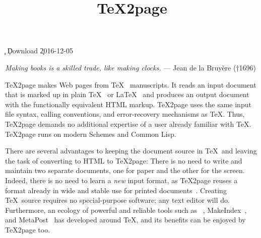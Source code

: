 %




\ifx\TZPtitle\UnDeFiNeD
\def\TZPtitle{TeX2page}\fi

\title{\TeX2page}

\smallskip

\c{}
%
\ifx\inpltdist\Undefined
\ifx\shipout\UnDeFiNeD
\c{Download
}
\else
\c{2016-12-05} %
\fi
\fi
%


\ifx\shipout\UnDeFiNeD
\centerline{}
\fi

{\obeylines\raggedleft
\ifx\shipout\UnDeFiNeD\small\else\eightfont\fi
{\it Making books is a skilled trade,
like making clocks.}
— Jean de la Bruyère (†1696)
}


\medskip


\n
\TeX2page
makes Web pages
from \TeX~\cite{texbook} manuscripts.
It reads an
input document that is marked up in
plain \TeX~\cite{clark:tex} or \LaTeX~\cite{latex}
and
produces an output document with the functionally
equivalent HTML markup.
\TeX2page uses the same input
file syntax, calling conventions, and  error-recovery
mechanisms as \TeX.  Thus, \TeX2page demands no additional
expertise of a user already familiar with \TeX.
\TeX2page runs on modern Schemes and Common Lisp.

There are several advantages to keeping the document
source in \TeX\ and leaving the task of converting to
HTML to \TeX2page:  There is no need to write and
maintain two separate documents, one for paper and the
other for the screen.  Indeed, there is no need to
learn a {\em new} input format, as \TeX2page reuses a
format already in wide and stable use for printed
documents~\cite{tug,ctan}.  Creating \TeX\
source requires no special-purpose software; any text
editor will do.  Furthermore, an ecology of powerful and
reliable tools such as \BibTeX~\cite{bibtex},
MakeIndex~\cite{makeindex}, and
MetaPost~\cite{metapost} has developed around \TeX, and
its benefits can be enjoyed by \TeX2page too.

